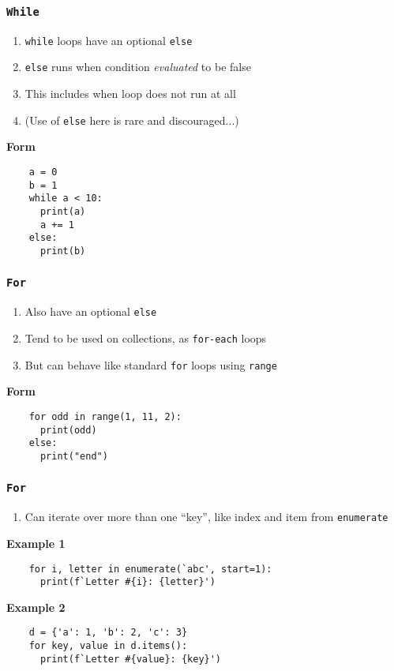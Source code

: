 \documentclass{beamer}
\begin{document}
\begin{frame}[fragile]
  \frametitle{\texttt{While}}

  \begin{enumerate}
    \item \texttt{while} loops have an optional \texttt{else}
    \item \texttt{else} runs when condition \textit{evaluated} to be false
    \item This includes when loop does not run at all
    \item (Use of \texttt{else} here is rare and discouraged...)
  \end{enumerate}

  \textbf{Form}
  \begin{lstlisting}
    a = 0
    b = 1
    while a < 10:
      print(a)
      a += 1
    else:
      print(b)
  \end{lstlisting}
\end{frame}

\begin{frame}[fragile]
  \frametitle{\texttt{For}}

  \begin{enumerate}
    \item Also have an optional \texttt{else}
    \item Tend to be used on collections, as \texttt{for-each} loops
    \item But can behave like standard \texttt{for} loops using \texttt{range}
  \end{enumerate}

  \textbf{Form}
  \begin{lstlisting}
    for odd in range(1, 11, 2):
      print(odd)
    else:
      print("end")
  \end{lstlisting}
\end{frame}

\begin{frame}[fragile]
  \frametitle{\texttt{For}}

  \begin{enumerate}
    \item Can iterate over more than one ``key'', like index and item from \texttt{enumerate}
  \end{enumerate}

  \textbf{Example 1}
  \begin{lstlisting}
    for i, letter in enumerate(`abc', start=1):
      print(f`Letter #{i}: {letter}')
  \end{lstlisting}

  \textbf{Example 2}
  \begin{lstlisting}
    d = {'a': 1, 'b': 2, 'c': 3}
    for key, value in d.items():
      print(f`Letter #{value}: {key}')
  \end{lstlisting}
\end{frame}
\end{document}
